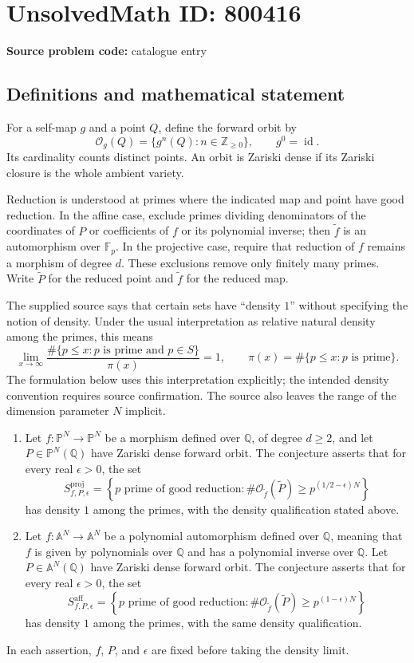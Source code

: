 \documentclass[11pt]{article}
\newcommand{\Z}{\mathbb{Z}}
\newcommand{\Q}{\mathbb{Q}}
\newcommand{\F}{\mathbb{F}}
\newcommand{\A}{\mathbb{A}}
\newcommand{\PP}{\mathbb{P}}
\begin{document}
\section*{UnsolvedMath ID: 800416}
\textbf{Source problem code:} catalogue entry
\subsection{Definitions and mathematical statement}
For a self-map \(g\) and a point \(Q\), define the forward orbit by
\[
\mathcal O_g(Q)=\{g^n(Q):n\in\Z_{\geq 0}\},\qquad g^0=\operatorname{id}.
\]
Its cardinality counts distinct points. An orbit is Zariski dense if its Zariski closure is the whole ambient variety.

Reduction is understood at primes where the indicated map and point have good reduction. In the affine case, exclude primes dividing denominators of the coordinates of \(P\) or coefficients of \(f\) or its polynomial inverse; then \(\widetilde f\) is an automorphism over \(\F_p\). In the projective case, require that reduction of \(f\) remains a morphism of degree \(d\). These exclusions remove only finitely many primes. Write \(\widetilde P\) for the reduced point and \(\widetilde f\) for the reduced map.

The supplied source says that certain sets have ``density \(1\)'' without specifying the notion of density. Under the usual interpretation as relative natural density among the primes, this means
\[
\lim_{x\to\infty}
\frac{\#\{p\leq x:p\text{ is prime and }p\in S\}}
{\pi(x)}=1,
\qquad
\pi(x)=\#\{p\leq x:p\text{ is prime}\}.
\]
The formulation below uses this interpretation explicitly; the intended density convention requires source confirmation. The source also leaves the range of the dimension parameter \(N\) implicit.

\begin{enumerate}
\item[(a)] Let \(f:\PP^N\to\PP^N\) be a morphism defined over \(\Q\), of degree \(d\geq2\), and let \(P\in\PP^N(\Q)\) have Zariski dense forward orbit. The conjecture asserts that for every real \(\epsilon>0\), the set
\[
S_{f,P,\epsilon}^{\mathrm{proj}}
=
\left\{p\text{ prime of good reduction}:
\#\mathcal O_{\widetilde f}(\widetilde P)
\geq p^{(1/2-\epsilon)N}\right\}
\]
has density \(1\) among the primes, with the density qualification stated above.

\item[(b)] Let \(f:\A^N\to\A^N\) be a polynomial automorphism defined over \(\Q\), meaning that \(f\) is given by polynomials over \(\Q\) and has a polynomial inverse over \(\Q\). Let \(P\in\A^N(\Q)\) have Zariski dense forward orbit. The conjecture asserts that for every real \(\epsilon>0\), the set
\[
S_{f,P,\epsilon}^{\mathrm{aff}}
=
\left\{p\text{ prime of good reduction}:
\#\mathcal O_{\widetilde f}(\widetilde P)
\geq p^{(1-\epsilon)N}\right\}
\]
has density \(1\) among the primes, with the same density qualification.
\end{enumerate}
In each assertion, \(f\), \(P\), and \(\epsilon\) are fixed before taking the density limit.
\end{document}
